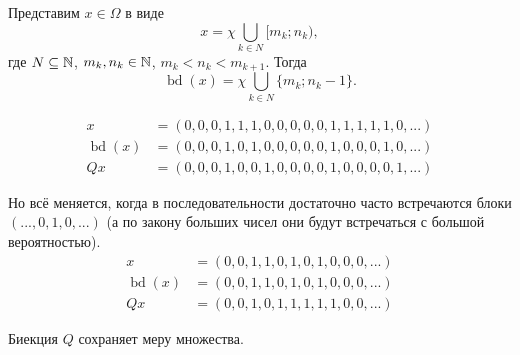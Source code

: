 \begin{definition}
	Представим $x\in\Omega$ в виде
	\begin{equation}
		x = \chi \bigcup_{k \in N} [m_k; n_k)
		,
	\end{equation}
	где $N\subseteq\mathbb{N}$, $m_k,n_k\in \mathbb{N}$, $m_k< n_k < m_{k+1}$.
	Тогда
	\begin{equation}
		\operatorname{bd}(x) = \chi \bigcup_{k \in N} \{m_k; n_k-1\}
		.
	\end{equation}
\end{definition}

\begin{example}
	\begin{equation}
		\begin{array}{rl}
			                   x &= (0,0,0,1,1,1,0,0,0,0,0,1,1,1,1,1,0,...)
			\\
			\operatorname{bd}(x) &= (0,0,0,1,0,1,0,0,0,0,0,1,0,0,0,1,0,...)
			\\
			                  Qx &= (0,0,0,1,0,0,1,0,0,0,0,1,0,0,0,0,1,...)
		\end{array}
	\end{equation}
\end{example}

\begin{example}
	Но всё меняется, когда в последовательности достаточно часто встречаются блоки $(...,0,1,0,...)$
	(а по закону больших чисел они будут встречаться с большой вероятностью).
	\begin{equation}
		\begin{array}{rl}
			                   x &= (0,0,1,1,0,1,0,1,0,0,0,...)
			\\
			\operatorname{bd}(x) &= (0,0,1,1,0,1,0,1,0,0,0,...)
			\\
			                  Qx &= (0,0,1,0,1,1,1,1,1,0,0,...)
		\end{array}
	\end{equation}
\end{example}


\begin{lemma}
	Биекция $Q$ сохраняет меру множества.
\end{lemma}


